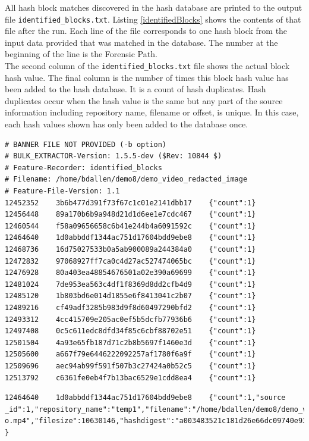 \documentclass[11pt,fleqn]{article} %
\begin{document}
All hash block matches discovered in the hash database are printed to the \bulk output file \texttt{identified\_blocks.txt}. Listing \ref{identifiedBlocks} shows the contents of that file after the \bulk run. Each line of the file corresponds to one hash block from the input data provided that was matched in the database. The number at the beginning of the line is the Forensic Path.\\


The second column of the \texttt{identified\_blocks.txt} file shows the actual block hash value. The final column is the number of times this block hash value has been added to the hash database. It is a count of hash duplicates. Hash duplicates occur when the hash value is the same but any part of the source information including repository name, filename or offset, is unique. In this case, each hash values shown has only been added to the database once.\\

\lstset{style=customfile}
\begin{lstlisting}[float, caption={The \texttt{identified\_blocks.txt} file produced by \bulk's \textit{hashdb} scanner. First column is the forensic path, second is the hash value, and third is the number of times the hash value occurs in the database}, label=identifiedBlocks]
# BANNER FILE NOT PROVIDED (-b option)
# BULK_EXTRACTOR-Version: 1.5.5-dev ($Rev: 10844 $)
# Feature-Recorder: identified_blocks
# Filename: /home/bdallen/demo8/demo_video_redacted_image
# Feature-File-Version: 1.1
12452352	3b6b477d391f73f67c1c01e2141dbb17	{"count":1}
12456448	89a170b6b9a948d21d1d6ee1e7cdc467	{"count":1}
12460544	f58a09656658c6b41e244b4a6091592c	{"count":1}
12464640	1d0abbddf1344ac751d17604bdd9ebe8	{"count":1}
12468736	16d75027533b0a5ab900089a244384a0	{"count":1}
12472832	97068927ff7ca0c4d27ac527474065bc	{"count":1}
12476928	80a403ea48854676501a02e390a69699	{"count":1}
12481024	7de953ea563c4df1f8369d8dd2cfb4d9	{"count":1}
12485120	1b803bd6e014d1855e6f8413041c2b07	{"count":1}
12489216	cf49adf3285b983d9f8d60497290bfd2	{"count":1}
12493312	4cc415709e205ac0ef5b5dcfb77936b6	{"count":1}
12497408	0c5c611edc8dfd34f85c6cbf88702e51	{"count":1}
12501504	4a93e65fb187d71c2b8b5697f1460e3d	{"count":1}
12505600	a667f79e6446222092257af1780f6a9f	{"count":1}
12509696	aec94ab99f591f507b3c27424a0b52c5	{"count":1}
12513792	c6361fe0eb4f7b13bac6529e1cdd8ea4	{"count":1}
\end{lstlisting}

\begin{lstlisting}[float, caption={The \texttt{identified\_sources.txt} file produced by post-processing the \texttt{identified\_blocks.txt} file. First column is the forensic path, second is the hash value, and third is the repository name, filename, and file offset}, label=identifiedSourceLine]
12464640	1d0abbddf1344ac751d17604bdd9ebe8	{"count":1,"source
_id":1,"repository_name":"temp1","filename":"/home/bdallen/demo8/demo_vide
o.mp4","filesize":10630146,"hashdigest":"a003483521c181d26e66dc09740e939d"
}
\end{lstlisting}
\end{document}
